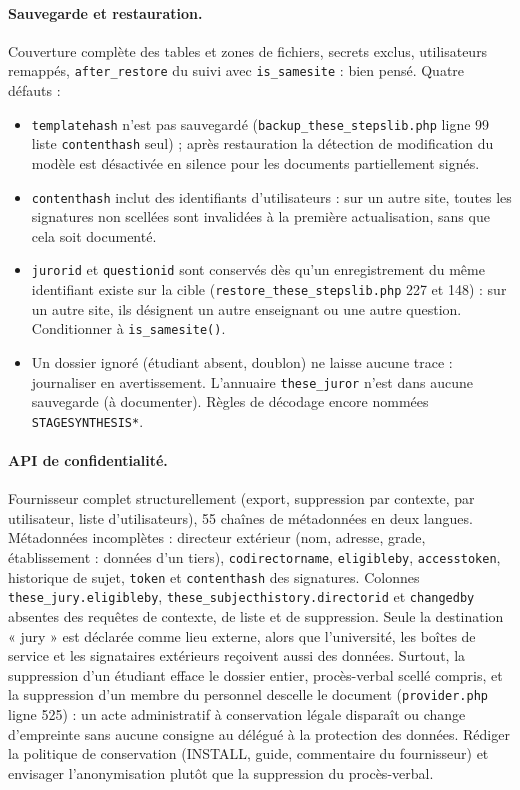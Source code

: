 \documentclass[11pt,a4paper]{article}
\newcommand{\fichier}[1]{\texttt{\small #1}}
\newcommand{\code}[1]{\texttt{#1}}
\begin{document}
\paragraph{Sauvegarde et restauration.}
Couverture complète des tables et zones de fichiers, secrets exclus, utilisateurs remappés,
\code{after\_restore} du suivi avec \code{is\_samesite} : bien pensé. Quatre défauts :
\begin{itemize}
  \item \code{templatehash} n'est pas sauvegardé (\fichier{backup\_these\_stepslib.php} ligne 99
    liste \code{contenthash} seul) ; après restauration la détection de modification du modèle
    est désactivée en silence pour les documents partiellement signés.
  \item \code{contenthash} inclut des identifiants d'utilisateurs : sur un autre site, toutes
    les signatures non scellées sont invalidées à la première actualisation, sans que cela soit
    documenté.
  \item \code{jurorid} et \code{questionid} sont conservés dès qu'un enregistrement du même
    identifiant existe sur la cible (\fichier{restore\_these\_stepslib.php} 227 et 148) : sur un
    autre site, ils désignent un autre enseignant ou une autre question. Conditionner à
    \code{is\_samesite()}.
  \item Un dossier ignoré (étudiant absent, doublon) ne laisse aucune trace : journaliser en
    avertissement. L'annuaire \code{these\_juror} n'est dans aucune sauvegarde (à documenter).
    Règles de décodage encore nommées \code{STAGESYNTHESIS*}.
\end{itemize}

\paragraph{API de confidentialité.}
Fournisseur complet structurellement (export, suppression par contexte, par utilisateur, liste
d'utilisateurs), 55 chaînes de métadonnées en deux langues. Métadonnées incomplètes : directeur
extérieur (nom, adresse, grade, établissement : données d'un tiers), \code{codirectorname},
\code{eligibleby}, \code{accesstoken}, historique de sujet, \code{token} et \code{contenthash}
des signatures. Colonnes \code{these\_jury.eligibleby},
\code{these\_subjecthistory.directorid} et \code{changedby} absentes des requêtes de contexte,
de liste et de suppression. Seule la destination « jury » est déclarée comme lieu externe, alors
que l'université, les boîtes de service et les signataires extérieurs reçoivent aussi des
données. Surtout, la suppression d'un étudiant efface le dossier entier, procès-verbal scellé
compris, et la suppression d'un membre du personnel descelle le document (\fichier{provider.php}
ligne 525) : un acte administratif à conservation légale disparaît ou change d'empreinte sans
aucune consigne au délégué à la protection des données. Rédiger la politique de conservation
(INSTALL, guide, commentaire du fournisseur) et envisager l'anonymisation plutôt que la
suppression du procès-verbal.
\end{document}
